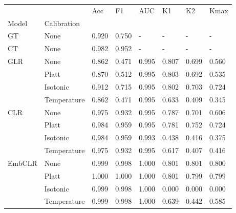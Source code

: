 \begin{tabular}{llllllll}
\toprule
 &  & Acc & F1 & AUC & K1 & K2 & Kmax \\
Model & Calibration &  &  &  &  &  &  \\
\midrule
GT & None & 0.920 & 0.750 & - & - & - & - \\
\cline{1-8}
CT & None & 0.982 & 0.952 & - & - & - & - \\
\cline{1-8}
\multirow[t]{4}{*}{GLR} & None & 0.862 & 0.471 & 0.995 & 0.807 & 0.699 & 0.560 \\
 & Platt & 0.870 & 0.512 & 0.995 & 0.803 & 0.692 & 0.535 \\
 & Isotonic & 0.912 & 0.715 & 0.995 & 0.802 & 0.703 & 0.724 \\
 & Temperature & 0.862 & 0.471 & 0.995 & 0.633 & 0.409 & 0.345 \\
\cline{1-8}
\multirow[t]{4}{*}{CLR} & None & 0.975 & 0.932 & 0.995 & 0.787 & 0.701 & 0.606 \\
 & Platt & 0.984 & 0.959 & 0.995 & 0.781 & 0.752 & 0.724 \\
 & Isotonic & 0.984 & 0.959 & 0.993 & 0.438 & 0.416 & 0.375 \\
 & Temperature & 0.975 & 0.932 & 0.995 & 0.617 & 0.407 & 0.416 \\
\cline{1-8}
\multirow[t]{4}{*}{EmbCLR} & None & 0.999 & 0.998 & 1.000 & 0.801 & 0.801 & 0.800 \\
 & Platt & 1.000 & 1.000 & 1.000 & 0.801 & 0.799 & 0.799 \\
 & Isotonic & 0.999 & 0.998 & 1.000 & 0.000 & 0.000 & 0.000 \\
 & Temperature & 0.999 & 0.998 & 1.000 & 0.639 & 0.442 & 0.585 \\
\cline{1-8}
\bottomrule
\end{tabular}
